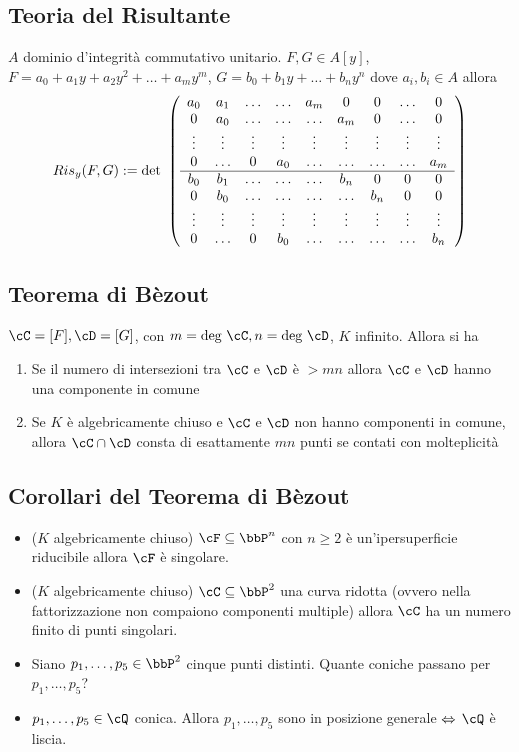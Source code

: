 \documentclass[a4paper,NoNotes,GeneralMath]{stdmdoc}
\begin{document}
	\subsection*{Teoria del Risultante}
	$A$ dominio d'integrità commutativo unitario. $F, G \in A[y]$, $F = a_0 + a_1 y + a_2 y^2 + \ldots + a_m y^m$, $G = b_0 + b_1 y + \ldots + b_n y^n$ dove $a_i, b_i \in A$ allora
	$$ Ris_y (F,G) := \mbox{det } \left( \begin{array}{ccccccccc}
	a_0		& a_1		& \ldots	& \ldots	& a_m		& 0	 		& 0			& \ldots	& 0		 \\
	0		& a_0		& \ldots	& \ldots	& \ldots	& a_m		& 0			& \ldots	& 0		 \\
	\vdots	& \vdots	& \vdots	& \vdots	& \vdots	& \vdots	& \vdots	& \vdots	& \vdots \\
	0		& \ldots	& 0			& a_0		& \ldots	& \ldots	& \ldots	& \ldots	& a_m	 \\
	\hline
	b_0		& b_1		& \ldots	& \ldots	& \ldots	& b_n		& 0			& 0			& 0		 \\
	0		& b_0		& \ldots	& \ldots	& \ldots	& \ldots	& b_n		& 0			& 0		 \\
	\vdots	& \vdots	& \vdots	& \vdots	& \vdots	& \vdots	& \vdots	& \vdots	& \vdots \\
	0		& \ldots	& 0			& b_0		& \ldots	& \ldots	& \ldots	& \ldots	& b_n	 \\
	\end{array} \right) $$

	\subsection*{Teorema di Bèzout}
	$\cC = [F], \cD = [G]$, con $m = \Deg \cC, n = \Deg \cD$, $K$ infinito. Allora si ha
	\begin{enumerate}
		\item Se il numero di intersezioni tra $\cC$ e $\cD$ è $> mn$ allora $\cC$ e $\cD$ hanno una componente in comune
		\item Se $K$ è algebricamente chiuso e $\cC$ e $\cD$ non hanno componenti in comune, allora $\cC \cap \cD$ consta di esattamente $mn$ punti se contati con molteplicità
	\end{enumerate}
	
	\subsection*{Corollari del Teorema di Bèzout}
	\begin{itemize}
		\item ($K$ algebricamente chiuso) $\cF \subseteq \bbP^n$ con $n \ge 2$ è un'ipersuperficie riducibile allora $\cF$ è singolare.
		\item ($K$ algebricamente chiuso) $\cC \subseteq \bbP^2$ una curva ridotta (ovvero nella fattorizzazione non compaiono componenti multiple) allora $\cC$ ha un numero finito di punti singolari.
		\item Siano $p_1, \ldots, p_5 \in \bbP^2$ cinque punti distinti. Quante coniche passano per $p_1, \ldots, p_5$?
		\item $p_1, \ldots, p_5 \in \cQ$ conica. Allora $p_1, \ldots, p_5$ sono in posizione generale $\Leftrightarrow$ $\cQ$ è liscia.
	\end{itemize}
\end{document}
